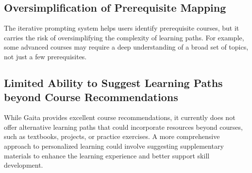 \subsection{Oversimplification of Prerequisite Mapping}

The iterative prompting system helps users identify prerequisite courses, but it carries the risk of oversimplifying the complexity of learning paths. For example, some advanced courses may require a deep understanding of a broad set of topics, not just a few prerequisites. 

\subsection{Limited Ability to Suggest Learning Paths beyond Course Recommendations}

While Gaita provides excellent course recommendations, it currently does not offer alternative learning paths that could incorporate resources beyond courses, such as textbooks, projects, or practice exercises. A more comprehensive approach to personalized learning could involve suggesting supplementary materials to enhance the learning experience and better support skill development.







